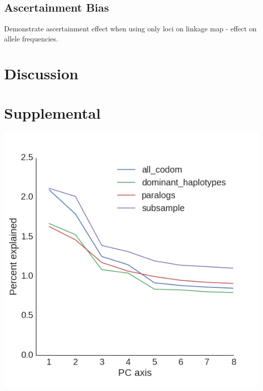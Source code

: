 \documentclass[12pt,  one column]{article}
\begin{document}
\subsection*{Ascertainment Bias}
Demonstrate ascertainment effect when using only loci on linkage map - effect on allele frequencies.


\section*{Discussion}

\section*{Supplemental}


\includegraphics[scale=.4]{figures/supplemental/PCA_eigenvalues.png}



\end{document}
